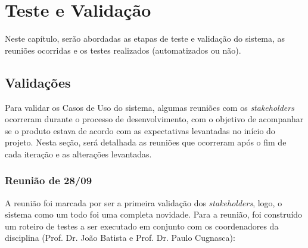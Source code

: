 \chapter{Teste e Validação}\label{chap:teste-validacao}
Neste capítulo, serão abordadas as etapas de teste e validação do sistema, as reuniões ocorridas e os testes realizados (automatizados ou não).

\section{Validações}
Para validar os Casos de Uso do sistema, algumas reuniões com os \textit{stakeholders} ocorreram durante o processo de desenvolvimento, com o objetivo de acompanhar se o produto estava de acordo com as expectativas levantadas no início do projeto. Nesta seção, será detalhada as reuniões que ocorreram após o fim de cada iteração e as alterações levantadas.

\subsection{Reunião de 28/09}
A reunião foi marcada por ser a primeira validação dos \textit{stakeholders}, logo, o sistema como um todo foi uma completa novidade. Para a reunião, foi construído um roteiro de testes a ser executado em conjunto com os coordenadores da disciplina (Prof. Dr. João Batista e Prof. Dr. Paulo Cugnasca):

